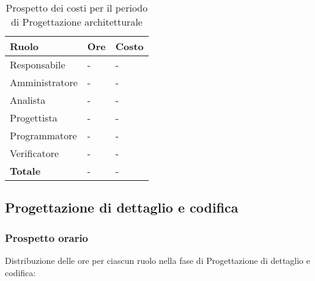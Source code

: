 		\begin{longtable}{ 
			>{\centering}p{} 
			>{\centering}p{}
			>{\centering\arraybackslash}p{} }
	
			\caption {Prospetto dei costi per il periodo di Progettazione architetturale}		\\
			
			\textbf{\color{white}Ruolo} & 
			\textbf{\color{white}Ore} & 
			\textbf{\color{white}Costo}
			\tabularnewline  
			\endhead
			
			Responsabile & - & - \\
			Amministratore & - & - \\
			Analista & - & - \\
			Progettista & - & - \\
			Programmatore & - & - \\
			Verificatore & - & - \\
			\textbf{Totale} & - & - \\
		\end{longtable}
		

\subsection{Progettazione di dettaglio e codifica}
	\subsubsection{Prospetto orario}
	Distribuzione delle ore per ciascun ruolo nella fase di Progettazione di dettaglio e codifica:
		
